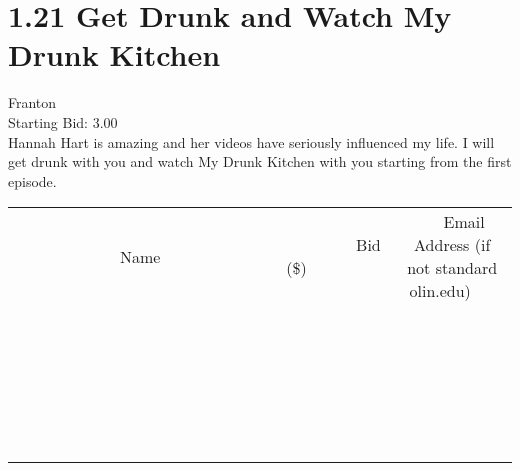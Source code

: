 \documentclass[11pt]{article}
\begin{document}
					\section*{1.21 Get Drunk and Watch My Drunk Kitchen}
					Franton \\
					Starting Bid: 3.00 \\
					Hannah Hart is amazing and her videos have seriously influenced my life. I will get drunk with you and watch My Drunk Kitchen with you starting from the first episode. \\
					[6ex]
					\begin{tabular}{c c c}
						~~~~~~~~~~~~~Name~~~~~~~~~~~~~ & ~~~~~~~~~Bid (\$)~~~~~~~~~ & ~~~Email Address (if not standard olin.edu)~~~ \\
				
 & & \\
\hline
 & & \\
\hline
 & & \\
\hline
 & & \\
\hline
 & & \\
\hline
 & & \\
\hline
 & & \\
\hline
 & & \\
\hline
 & & \\
\hline
 & & \\
\hline
 & & \\
\hline
 & & \\
\hline
 & & \\
\hline
 & & \\
\hline
 & & \\
\hline
 & & \\
\hline
 & & \\
\hline
 & & \\
\hline
 & & \\
\hline
 & & \\
\hline
 & & \\
\hline
 & & \\
\hline
 & & \\
\hline
 & & \\
\hline
 & & \\
\hline
 & & \\
\hline
					\end{tabular}
					\clearpage
				
\end{document}
